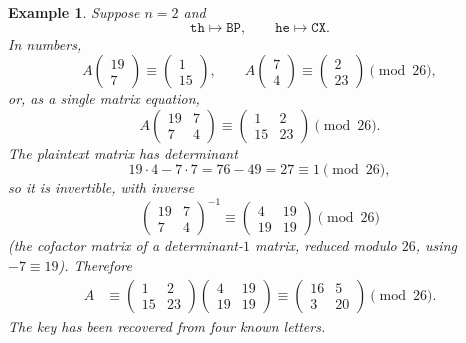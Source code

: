 \documentclass[11pt]{article}
\newtheorem{example}[theorem]{Example}
\theoremstyle{remark}
\begin{document}
\begin{example}
Suppose $n=2$ and
\[
    \texttt{th}\mapsto\texttt{BP},
    \qquad
    \texttt{he}\mapsto\texttt{CX}.
\]
In numbers,
\[
    A
    \begin{pmatrix} 19 \\ 7 \end{pmatrix}
    \equiv
    \begin{pmatrix} 1 \\ 15 \end{pmatrix},
    \qquad
    A
    \begin{pmatrix} 7 \\ 4 \end{pmatrix}
    \equiv
    \begin{pmatrix} 2 \\ 23 \end{pmatrix}
    \pmod{26},
\]
or, as a single matrix equation,
\[
    A
    \begin{pmatrix}
    19 & 7 \\
    7 & 4
    \end{pmatrix}
    \equiv
    \begin{pmatrix}
    1 & 2 \\
    15 & 23
    \end{pmatrix}
    \pmod{26}.
\]
The plaintext matrix has determinant
\[
    19\cdot 4 - 7\cdot 7 = 76-49=27\equiv 1 \pmod{26},
\]
so it is invertible, with inverse
\[
    \begin{pmatrix}
    19 & 7 \\
    7 & 4
    \end{pmatrix}^{-1}
    \equiv
    \begin{pmatrix}
    4 & 19 \\
    19 & 19
    \end{pmatrix}
    \pmod{26}
\]
(the cofactor matrix of a determinant-$1$ matrix, reduced modulo $26$,
using $-7\equiv 19$). Therefore
\begin{align*}
    A
    &\equiv
    \begin{pmatrix} 1 & 2 \\ 15 & 23 \end{pmatrix}
    \begin{pmatrix} 4 & 19 \\ 19 & 19 \end{pmatrix}
    \equiv
    \begin{pmatrix} 16 & 5 \\ 3 & 20 \end{pmatrix}
    \pmod{26}.
\end{align*}
The key has been recovered from four known letters.
\end{example}
\end{document}
